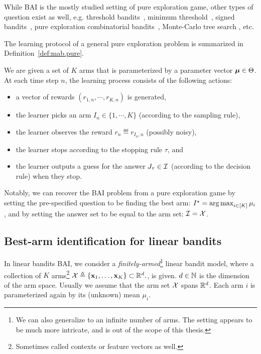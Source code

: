 While BAI is the mostly studied setting of pure exploration game, other types of question exist as well, e.g. threshold bandits~\citep{locatelli2016thresholding}, minimum threshold~\citep{kaufmann2018murphy}, signed bandits~\citep{menard2019lma}, pure exploration combinatorial bandits~\citep{chen2014combinatorial}, Monte-Carlo tree search \citep{teraoka2014mc}, etc.

The learning protocol of a general pure exploration problem is summarized in Definition~\ref{def:mab.pure}.

\begin{definition}\label{def:mab.pure}
\begin{leftbar}[defnbar]
	We are given a set of $K$ arms that is parameterized by a parameter vector ${\boldsymbol \mu}\in\Theta$. At each time step $n$, the learning process consists of the following actions:
\begin{itemize}
	\item a vector of rewards $(r_{1,n}, \cdots, r_{K,n})$ is generated,
	\item the learner picks an arm $I_n \in \{1,\cdots,K\}$ (according to the sampling rule),
	\item the learner observes the reward $r_n \eqdef r_{I_n, n}$ (possibly noisy),
	\item the learner stops according to the stopping rule $\tau$, and
	\item the learner outputs a guess for the answer $J_\tau \in \mathcal{I}$ (according to the decision rule) when they stop.
\end{itemize}
\end{leftbar}
\end{definition}

Notably, we can recover the BAI problem from a pure exploration game by setting the pre-specified question to be finding the best arm: $I^\star = \operatorname*{arg\,max}_{i\in[K]}\mu_i$, and by setting the answer set to be equal to the arm set: $\mathcal{I} = \mathcal{X}$.

\subsection{Best-arm identification for linear bandits}\label{sec:mab.extensions.linear}

In linear bandits BAI, we consider a \emph{finitely-armed}\footnote{We can also generalize to an infinite number of arms. The setting appears to be much more intricate, and is out of the scope of this thesis.} linear bandit model, where a collection of $K$ arms\footnote{Sometimes called contexts or feature vectors as well.} $\mathcal{X}\triangleq\{{\bf x}_1,\ldots,{\bf x}_K\}\subset \mathbb{R}^d.$, is given. $d\in{\mathbb N}$ is the dimension of the arm space. Usually we assume that the arm set $\mathcal{X}$ spans $\mathbb{R}^d$. Each arm $i$ is parameterized again by its (unknown) mean $\mu_i$. 


